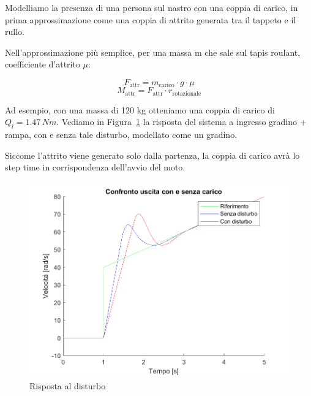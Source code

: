 \documentclass[a4paper,12pt]{article}
\begin{document}
Modelliamo la presenza di una persona sul nastro con una coppia di carico, in prima approssimazione come una coppia di attrito generata tra il tappeto e il rullo.

\vspace{0.3cm}

Nell'approssimazione più semplice, per una massa m che sale sul tapis roulant, coefficiente d'attrito $\mu$:

\vspace{0.3cm}

\[
    F_{\text{attr}} = m_{\text{carico}} \cdot g \cdot \mu
\]
\[
    M_{\text{attr}} = F_{\text{attr}} \cdot r_{\text{rotazionale}}
\]

\vspace{0.1cm}

Ad esempio, con una massa di 120 kg otteniamo una coppia di carico di $Q_l = 1.47\,Nm$. Vediamo in Figura~\ref{fig: disturbo} la risposta del sistema a ingresso gradino + rampa, con e senza tale disturbo, modellato come un gradino.

Siccome l'attrito viene generato solo dalla partenza, la coppia di carico avrà lo step time in corrispondenza dell'avvio del moto.

\vspace{0.5cm}

\begin{figure}[h!]
    \centering
    \includegraphics[scale = 0.65]{Immagini/PlotMatlab/rispostaCoppiaCarico.png}
    \caption{Risposta al disturbo}
    \label{fig: disturbo}
\end{figure}
\end{document}
